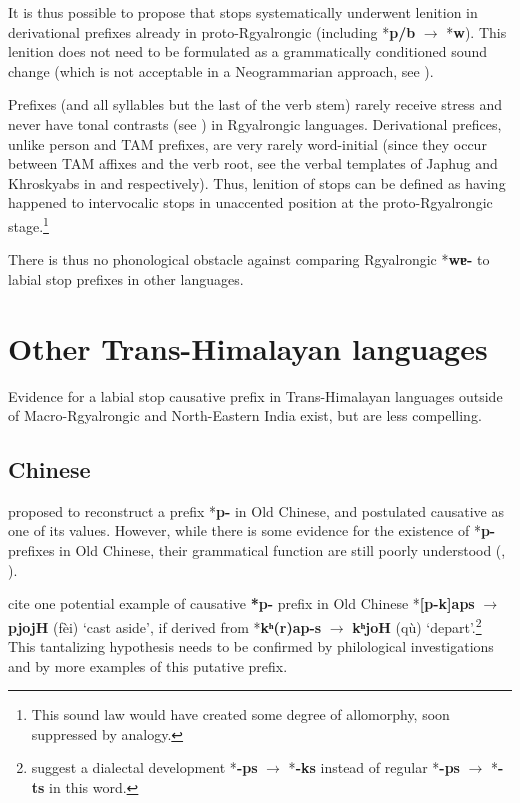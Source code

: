 \documentclass[oneside,a4paper,11pt]{article}
\newcommand{\ipa}[1]{\textbf{{\phon\mbox{#1}}}} %
\newcommand{\zh}[1]{{\cn{#1}}}
\begin{document}
It is thus possible to propose that stops systematically underwent lenition in derivational prefixes already in proto-Rgyalrongic (including *\ipa{p/b} $\rightarrow$ *\ipa{w}). This lenition does not need to be formulated as a grammatically conditioned sound change (which is not acceptable in a Neogrammarian approach, see \citealt{hill14conditioned}). 

Prefixes (and all syllables but the last of the verb stem) rarely receive stress and never have tonal contrasts (see \citealt{jackson05yingao}) in Rgyalrongic languages. Derivational prefices, unlike person and TAM prefixes, are very rarely word-initial (since they occur between TAM affixes and the verb root, see the verbal templates of Japhug and Khroskyabs in \citealt{jacques13harmonization} and \citealt{lai15person} respectively). Thus, lenition of stops can be defined as having happened to intervocalic stops in unaccented position at the proto-Rgyalrongic stage.\footnote{This sound law would have created some degree of allomorphy, soon suppressed by analogy.}

There is thus no phonological obstacle against comparing Rgyalrongic *\ipa{wɐ-} to labial stop prefixes in other languages.

 \section{Other Trans-Himalayan languages} 
Evidence for a labial stop causative  prefix in Trans-Himalayan languages outside of Macro-Rgyalrongic and North-Eastern India exist, but are less compelling.

\subsection{Chinese}
 \citet[593]{maspero52} proposed to reconstruct a prefix *\ipa{p-} in Old Chinese, and postulated causative as one of its values. However,  while there is some evidence for the existence of *\ipa{p-} prefixes in Old Chinese, their grammatical function are still poorly understood (\citealt[87-9]{sagart99roc}, \citealt{behr10ocp}).
 
 \citet[154]{bs14oc} cite one potential example of causative \ipa{*p-} prefix in Old Chinese \zh{廢} *\ipa{[p-k]aps} $\rightarrow$ \ipa{pjojH} (fèi) `cast aside', if derived from \zh{去} *\ipa{kʰ(r)ap-s} $\rightarrow$ \ipa{kʰjoH} (qù) `depart'.\footnote{ \citet[153]{bs14oc} suggest a dialectal development *\ipa{-ps} $\rightarrow$ *\ipa{-ks} instead of regular *\ipa{-ps} $\rightarrow$ *\ipa{-ts} in this word. } This tantalizing hypothesis needs to be confirmed by philological investigations and by more examples of this putative prefix.
  
\end{document}
